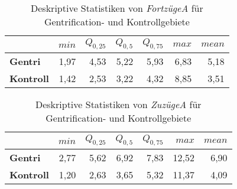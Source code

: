 \begin{table}[H]
\centering
\begin{tabular}{@{}lrrrrrr@{}}
\toprule
               & $min$ & $Q_{0,25}$ & $Q_{0,5}$ & $Q_{0,75}$ & $max$ & $mean$ \\ \midrule
{\bf Gentri}   & 1,97 & 4,53 & 5,22 & 5,93 & 6,83  & 5,18 \\
{\bf Kontroll} & 1,42 & 2,53 & 3,22 & 4,32 & 8,85  & 3,51 \\ \bottomrule
\end{tabular}
\caption{Deskriptive Statistiken von \textit{FortzügeA} für Gentrification- und Kontrollgebiete}
\label{tab:FortzuegeUDAR}
\end{table}

\begin{table}[H]
\centering
\begin{tabular}{@{}lrrrrrr@{}}
\toprule
               & $min$ & $Q_{0,25}$ & $Q_{0,5}$ & $Q_{0,75}$ & $max$ & $mean$ \\ \midrule
{\bf Gentri}   & 2,77  & 5,62       & 6,92      & 7,83       & 12,52 & 6,90   \\
{\bf Kontroll} & 1,20  & 2,63       & 3,65      & 5,32       & 11,37 & 4,09   \\ \bottomrule
\end{tabular}
\caption{Deskriptive Statistiken von \textit{ZuzügeA} für Gentrification- und Kontrollgebiete}
\label{tab:ZuzuegeUDAR}
\end{table}

